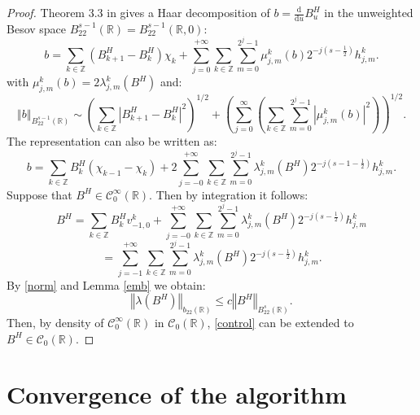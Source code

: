 \documentclass[11pt]{enstaPRE}
\newcommand{\de}[2]{\frac{\mathrm{d} #1}{\mathrm{d} #2}}
\newcommand{\norme}[1]{\left\Vert #1\right\Vert}
\newcommand{\R}{\mathbb{R}}
\newcommand{\Z}{\mathbb{Z}}
\begin{document}
\begin{proof}
    Theorem 3.3 in \cite{Tri-fab} gives a Haar decomposition of $b=\de{}{u} B^H_u$ in the unweighted Besov space $B^{s-1}_{22}(\R)=B^{s-1}_{22}(\R,0)$:
    \begin{equation}
    b =\sum_{k\in\Z}\left(B^H_{k+1}-B^H_k\right)\chi_k +\sum_{j=0}^{+\infty}\sum_{k\in\Z}\sum_{m=0}^{2^j-1}\mu_{j,m}^k(b)2^{-j\left(s-\frac{1}{2}\right)}h_{j,m}^k.
    \end{equation}
    with $\mu^k_{j,m}(b)=2\lambda^k_{j,m}(B^H)$ and:
    \begin{equation}\label{norm}
    \norme{b}_{B^{s-1}_{22}(\R)} \sim \left(\sum_{k\in\Z}\left|B^H_{k+1}-B^H_k\right|^2\right)^{1/2} + \left(\sum_{j=0}^\infty\left(\sum_{k\in\Z}\sum_{m=0}^{2^j-1}\left|\mu_{j,m}^k(b)\right|^2\right)\right)^{1/2}.
    \end{equation}    
    The representation can also be written as:
    \begin{equation}
    b = \sum_{k\in\Z} B^H_k(\chi_{k-1}-\chi_k) + 2\sum_{j=-0}^{+\infty}\sum_{k\in\Z}\sum_{m=0}^{2^j-1}\lambda_{j,m}^k\left(B^H\right)2^{-j\left(s-1-\frac{1}{2}\right)}h_{j,m}^k.
    \end{equation}
    Suppose that $B^H\in\mathcal{C}^\infty_0(\R)$. Then by integration it follows:
     \begin{equation*}
    B^H = \sum_{k\in\Z} B^H_k v^k_{-1,0} + \sum_{j=-0}^{+\infty}\sum_{k\in\Z}\sum_{m=0}^{2^j-1}\lambda_{j,m}^k\left(B^H\right)2^{-j\left(s-\frac{1}{2}\right)}h_{j,m}^k
    \end{equation*}
     \begin{equation}\label{rep}
    =\sum_{j=-1}^{+\infty}\sum_{k\in\Z}\sum_{m=0}^{2^j-1}\lambda_{j,m}^k\left(B^H\right)2^{-j\left(s-\frac{1}{2}\right)}h_{j,m}^k.
    \end{equation}    
By \ref{norm} and Lemma \ref{emb} we obtain:
\begin{equation}\label{control}
\norme{\lambda(B^H)}_{b_{22}(\R)} \leq c\norme{B^H}_{B^s_{22}(\R)}.
\end{equation}
Then, by density of $\mathcal{C}^\infty_0(\R)$ in $\mathcal{C}_0
(\R)$, \ref{control} can be extended to $B^H\in\mathcal{C}_0
(\R)$. 

\end{proof}

\part{Convergence of the algorithm}
\end{document}
